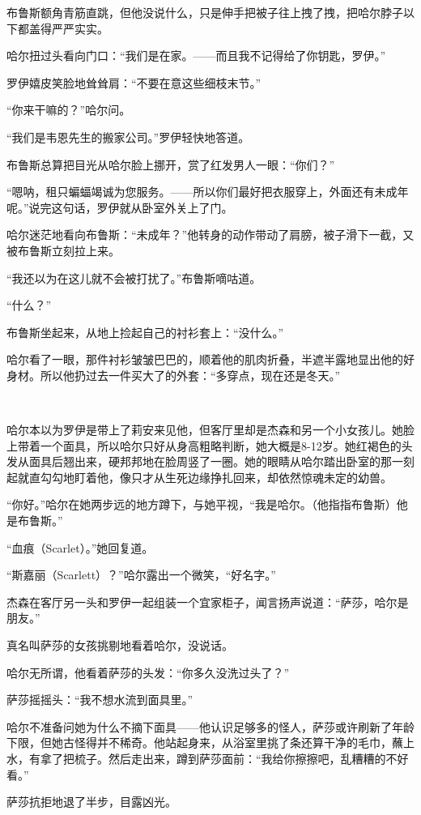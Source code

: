\documentclass[../main]{subfiles}
\begin{document}
布鲁斯额角青筋直跳，但他没说什么，只是伸手把被子往上拽了拽，把哈尔脖子以下都盖得严严实实。

哈尔扭过头看向门口：“我们是在家。——而且我不记得给了你钥匙，罗伊。”

罗伊嬉皮笑脸地耸耸肩：“不要在意这些细枝末节。”

“你来干嘛的？”哈尔问。

“我们是韦恩先生的搬家公司。”罗伊轻快地答道。

布鲁斯总算把目光从哈尔脸上挪开，赏了红发男人一眼：“你们？”

“嗯呐，租只蝙蝠竭诚为您服务。——所以你们最好把衣服穿上，外面还有未成年呢。”说完这句话，罗伊就从卧室外关上了门。

哈尔迷茫地看向布鲁斯：“未成年？”他转身的动作带动了肩膀，被子滑下一截，又被布鲁斯立刻拉上来。

“我还以为在这儿就不会被打扰了。”布鲁斯嘀咕道。

“什么？”

布鲁斯坐起来，从地上捡起自己的衬衫套上：“没什么。”

哈尔看了一眼，那件衬衫皱皱巴巴的，顺着他的肌肉折叠，半遮半露地显出他的好身材。所以他扔过去一件买大了的外套：“多穿点，现在还是冬天。”

~\

哈尔本以为罗伊是带上了莉安来见他，但客厅里却是杰森和另一个小女孩儿。她脸上带着一个面具，所以哈尔只好从身高粗略判断，她大概是8-12岁。她红褐色的头发从面具后翘出来，硬邦邦地在脸周竖了一圈。她的眼睛从哈尔踏出卧室的那一刻起就直勾勾地盯着他，像只才从生死边缘挣扎回来，却依然惊魂未定的幼兽。

“你好。”哈尔在她两步远的地方蹲下，与她平视，“我是哈尔。（他指指布鲁斯）他是布鲁斯。”

“血痕（Scarlet）。”她回复道。

“斯嘉丽（Scarlett）？”哈尔露出一个微笑，“好名字。”

杰森在客厅另一头和罗伊一起组装一个宜家柜子，闻言扬声说道：“萨莎，哈尔是朋友。”

真名叫萨莎的女孩挑剔地看着哈尔，没说话。

哈尔无所谓，他看着萨莎的头发：“你多久没洗过头了？”

萨莎摇摇头：“我不想水流到面具里。”

哈尔不准备问她为什么不摘下面具——他认识足够多的怪人，萨莎或许刷新了年龄下限，但她古怪得并不稀奇。他站起身来，从浴室里挑了条还算干净的毛巾，蘸上水，有拿了把梳子。然后走出来，蹲到萨莎面前：“我给你擦擦吧，乱糟糟的不好看。”

萨莎抗拒地退了半步，目露凶光。
\end{document}
